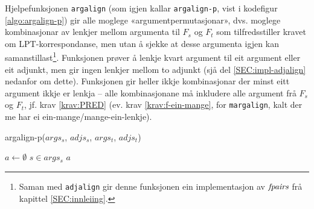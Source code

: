 \documentclass[12pt,a4paper,oneside,draft]{report}
\newcommand{\fpairs}{\ensuremath{\operatorname{\emph{fpairs}}}}
\begin{document}
 Hjelpefunksjonen \texttt{argalign} (som igjen kallar \texttt{argalign-p}, vist i
 kodefigur \ref{algo:argalign-p}) gir alle moglege
 «argumentpermutasjonar», dvs. moglege kombinasjonar av lenkjer mellom
 argumenta til $F_s$ og $F_t$ som tilfredsstiller kravet om
 LPT\hyp{}korrespondanse, men utan å sjekke at desse argumenta igjen kan
 samanstillast\footnote{Saman med \texttt{adjalign} gir denne funksjonen ein implementasjon
        av \fpairs{} frå kapittel \ref{SEC:innleiing}. }. Funksjonen prøver å lenkje kvart argument til eit
 argument eller eit adjunkt, men gir ingen lenkjer mellom to adjunkt
 (sjå del \ref{SEC:impl-adjalign} nedanfor om dette). Funksjonen gir
 heller ikkje kombinasjonar der minst eitt argument ikkje er lenkja --
 alle kombinasjonane må inkludere alle argument frå $F_s$ og $F_t$,
 jf. krav \ref{krav:PRED} (ev. krav \ref{krav:f-ein-mange}, for
 \texttt{margalign}, kalt der me har ei ein-mange/mange-ein-lenkje). 
  \begin{algorithm}[htbp]
    \caption{argalign-p($args_s$, $adjs_s$, $args_t$, $adjs_t$)}
    \label{algo:argalign-p}
    
    \BlankLine
    
    $a \gets \emptyset$\;
     {
      $s \in args_s$\;
       {
      }
       {
      }
      \Return $a$\;
    }
     {
    }
  \end{algorithm}
\end{document}
